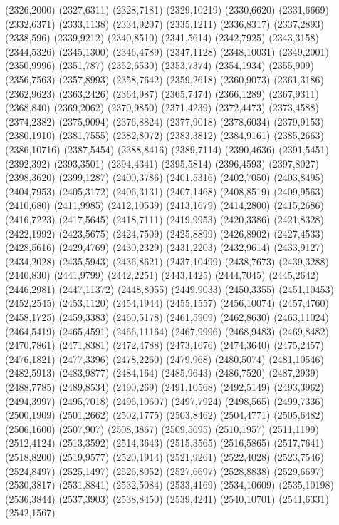 (2326,2000)
(2327,6311)
(2328,7181)
(2329,10219)
(2330,6620)
(2331,6669)
(2332,6371)
(2333,1138)
(2334,9207)
(2335,1211)
(2336,8317)
(2337,2893)
(2338,596)
(2339,9212)
(2340,8510)
(2341,5614)
(2342,7925)
(2343,3158)
(2344,5326)
(2345,1300)
(2346,4789)
(2347,1128)
(2348,10031)
(2349,2001)
(2350,9996)
(2351,787)
(2352,6530)
(2353,7374)
(2354,1934)
(2355,909)
(2356,7563)
(2357,8993)
(2358,7642)
(2359,2618)
(2360,9073)
(2361,3186)
(2362,9623)
(2363,2426)
(2364,987)
(2365,7474)
(2366,1289)
(2367,9311)
(2368,840)
(2369,2062)
(2370,9850)
(2371,4239)
(2372,4473)
(2373,4588)
(2374,2382)
(2375,9094)
(2376,8824)
(2377,9018)
(2378,6034)
(2379,9153)
(2380,1910)
(2381,7555)
(2382,8072)
(2383,3812)
(2384,9161)
(2385,2663)
(2386,10716)
(2387,5454)
(2388,8416)
(2389,7114)
(2390,4636)
(2391,5451)
(2392,392)
(2393,3501)
(2394,4341)
(2395,5814)
(2396,4593)
(2397,8027)
(2398,3620)
(2399,1287)
(2400,3786)
(2401,5316)
(2402,7050)
(2403,8495)
(2404,7953)
(2405,3172)
(2406,3131)
(2407,1468)
(2408,8519)
(2409,9563)
(2410,680)
(2411,9985)
(2412,10539)
(2413,1679)
(2414,2800)
(2415,2686)
(2416,7223)
(2417,5645)
(2418,7111)
(2419,9953)
(2420,3386)
(2421,8328)
(2422,1992)
(2423,5675)
(2424,7509)
(2425,8899)
(2426,8902)
(2427,4533)
(2428,5616)
(2429,4769)
(2430,2329)
(2431,2203)
(2432,9614)
(2433,9127)
(2434,2028)
(2435,5943)
(2436,8621)
(2437,10499)
(2438,7673)
(2439,3288)
(2440,830)
(2441,9799)
(2442,2251)
(2443,1425)
(2444,7045)
(2445,2642)
(2446,2981)
(2447,11372)
(2448,8055)
(2449,9033)
(2450,3355)
(2451,10453)
(2452,2545)
(2453,1120)
(2454,1944)
(2455,1557)
(2456,10074)
(2457,4760)
(2458,1725)
(2459,3383)
(2460,5178)
(2461,5909)
(2462,8630)
(2463,11024)
(2464,5419)
(2465,4591)
(2466,11164)
(2467,9996)
(2468,9483)
(2469,8482)
(2470,7861)
(2471,8381)
(2472,4788)
(2473,1676)
(2474,3640)
(2475,2457)
(2476,1821)
(2477,3396)
(2478,2260)
(2479,968)
(2480,5074)
(2481,10546)
(2482,5913)
(2483,9877)
(2484,164)
(2485,9643)
(2486,7520)
(2487,2939)
(2488,7785)
(2489,8534)
(2490,269)
(2491,10568)
(2492,5149)
(2493,3962)
(2494,3997)
(2495,7018)
(2496,10607)
(2497,7924)
(2498,565)
(2499,7336)
(2500,1909)
(2501,2662)
(2502,1775)
(2503,8462)
(2504,4771)
(2505,6482)
(2506,1600)
(2507,907)
(2508,3867)
(2509,5695)
(2510,1957)
(2511,1199)
(2512,4124)
(2513,3592)
(2514,3643)
(2515,3565)
(2516,5865)
(2517,7641)
(2518,8200)
(2519,9577)
(2520,1914)
(2521,9261)
(2522,4028)
(2523,7546)
(2524,8497)
(2525,1497)
(2526,8052)
(2527,6697)
(2528,8838)
(2529,6697)
(2530,3817)
(2531,8841)
(2532,5084)
(2533,4169)
(2534,10609)
(2535,10198)
(2536,3844)
(2537,3903)
(2538,8450)
(2539,4241)
(2540,10701)
(2541,6331)
(2542,1567)
